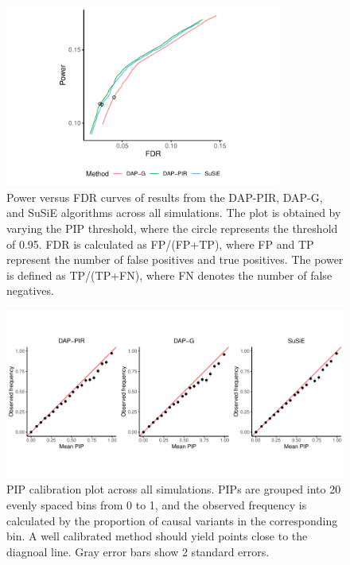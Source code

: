 \documentclass[pdflatex,sn-mathphys-num]{sn-jnl}%
\theoremstyle{thmstyleone}%
\theoremstyle{thmstyletwo}%
\theoremstyle{thmstylethree}%
\begin{document}
\begin{figure}[H]
    \centering
    \includegraphics[width=0.8\textwidth]{files/plot_power.pdf}
    \caption{Power versus FDR curves of results from the DAP-PIR, DAP-G, and SuSiE algorithms across all simulations. The plot is obtained by varying the PIP threshold, where the circle represents the threshold of 0.95. FDR is calculated as FP/(FP+TP), where FP and TP represent the number of false positives and true positives. The power is defined as TP/(TP+FN), where FN denotes the number of false negatives.}
    \label{fig:power}
\end{figure}

\begin{figure}[H]
    \centering
    \includegraphics[width=1\textwidth]{files/plot_cali_gtex.pdf}
    \vspace{-1cm}
    \caption{PIP calibration plot across all simulations. PIPs are grouped into 20 evenly spaced bins from 0 to 1, and the observed frequency is calculated by the proportion of causal variants in the corresponding bin. A well calibrated method should yield points close to the diagnoal line. Gray error bars show 2 standard errors.}
    \label{fig:calibration}
\end{figure}
\end{document}
